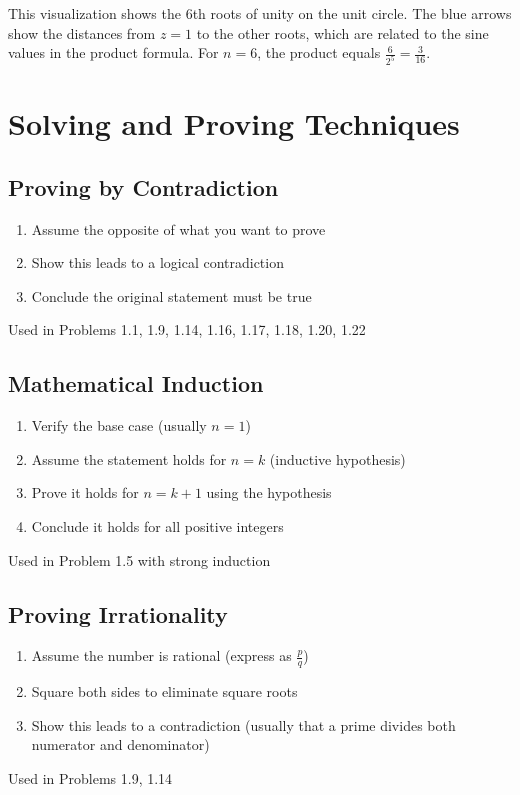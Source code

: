 This visualization shows the 6th roots of unity on the unit circle. The blue arrows show the distances from $z = 1$ to the other roots, which are related to the sine values in the product formula. For $n = 6$, the product equals $\frac{6}{2^5} = \frac{3}{16}$.

\section{Solving and Proving Techniques}

\subsection*{Proving by Contradiction}
\begin{enumerate}
\item Assume the opposite of what you want to prove
\item Show this leads to a logical contradiction
\item Conclude the original statement must be true
\end{enumerate}
Used in Problems 1.1, 1.9, 1.14, 1.16, 1.17, 1.18, 1.20, 1.22

\subsection*{Mathematical Induction}
\begin{enumerate}
\item Verify the base case (usually $n = 1$)
\item Assume the statement holds for $n = k$ (inductive hypothesis)
\item Prove it holds for $n = k + 1$ using the hypothesis
\item Conclude it holds for all positive integers
\end{enumerate}
Used in Problem 1.5 with strong induction

\subsection*{Proving Irrationality}
\begin{enumerate}
\item Assume the number is rational (express as $\frac{p}{q}$)
\item Square both sides to eliminate square roots
\item Show this leads to a contradiction (usually that a prime divides both numerator and denominator)
\end{enumerate}
Used in Problems 1.9, 1.14

